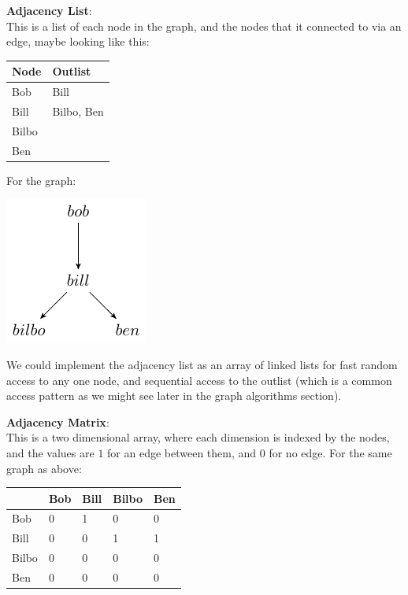 \begin{description}
  \item \textbf{Adjacency List}:\\
    This is a list of each node in the graph, and the nodes that it connected to
    via an edge, maybe looking like this:

    \begin{center}
      \begin{tabular}{l|l}
        \textbf{Node} & \textbf{Outlist}\\ \hline
        Bob   & Bill\\
        Bill  & Bilbo, Ben\\
        Bilbo & \\
        Ben   & \\
      \end{tabular}
    \end{center}

    For the graph:

    \begin{center}
      \includegraphics{digraphs/1.pdf}
    \end{center}

    We could implement the adjacency list as an array of linked lists for fast
    random access to any one node, and sequential access to the outlist (which
    is a common access pattern as we might see later in the graph algorithms
    section).
  \item \textbf{Adjacency Matrix}:\\
    This is a two dimensional array, where each dimension is indexed by the
    nodes, and the values are $1$ for an edge between them, and $0$ for no edge.
    For the same graph as above:

    \begin{center}
      \begin{tabular}{|l|l|l|l|l|}
        \hline
              & Bob  & Bill  & Bilbo & Ben\\ \hline
        Bob   & 0    & 1     & 0     & 0  \\ \hline
        Bill  & 0    & 0     & 1     & 1  \\ \hline
        Bilbo & 0    & 0     & 0     & 0  \\ \hline
        Ben   & 0    & 0     & 0     & 0  \\ \hline
      \end{tabular}
    \end{center}


\end{description}
